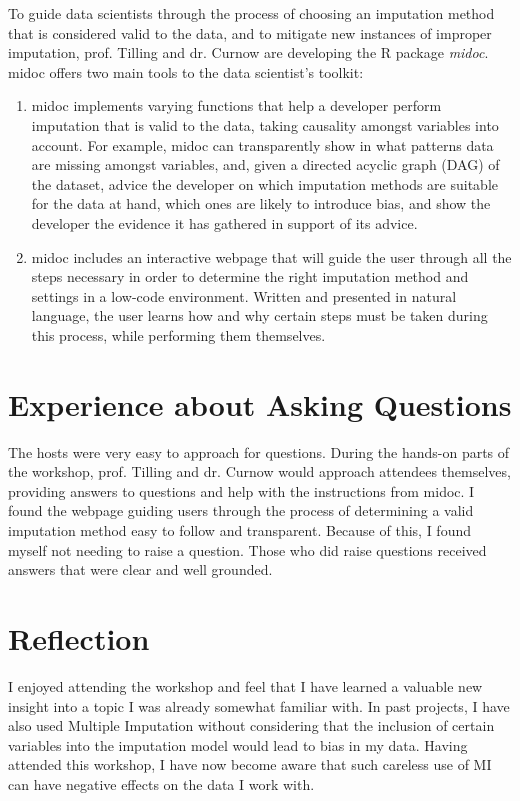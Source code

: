 \documentclass{IEEEtran}
\begin{document}
To guide data scientists through the process of choosing an imputation method that is considered valid to the data, and to mitigate new instances of improper imputation, prof. Tilling and dr. Curnow are developing the R package \textit{midoc}.
midoc offers two main tools to the data scientist's toolkit:
\begin{enumerate}
    \item midoc implements varying functions that help a developer perform imputation that is valid to the data, taking causality amongst variables into account.
    For example, midoc can transparently show in what patterns data are missing amongst variables, and, given a directed acyclic graph (DAG) of the dataset, advice the developer on which imputation methods are suitable for the data at hand, which ones are likely to introduce bias, and show the developer the evidence it has gathered in support of its advice.
    \item midoc includes an interactive webpage that will guide the user through all the steps necessary in order to determine the right imputation method and settings in a low-code environment.
    Written and presented in natural language, the user learns how and why certain steps must be taken during this process, while performing them themselves.
\end{enumerate}

\section{Experience about Asking Questions}
The hosts were very easy to approach for questions.
During the hands-on parts of the workshop, prof. Tilling and dr. Curnow would approach attendees themselves, providing answers to questions and help with the instructions from midoc.
I found the webpage guiding users through the process of determining a valid imputation method easy to follow and transparent.
Because of this, I found myself not needing to raise a question.
Those who did raise questions received answers that were clear and well grounded.

\section{Reflection}
I enjoyed attending the workshop and feel that I have learned a valuable new insight into a topic I was already somewhat familiar with.
In past projects, I have also used Multiple Imputation without considering that the inclusion of certain variables into the imputation model would lead to bias in my data.
Having attended this workshop, I have now become aware that such careless use of MI can have negative effects on the data I work with.
\end{document}
